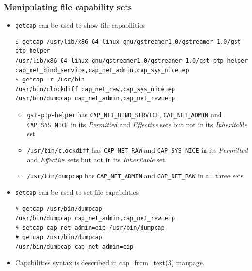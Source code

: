 \begin{frame}[fragile]
	\frametitle{Manipulating file capability sets}
	\begin{itemize}
		\item \texttt{getcap} can be used to show file capabilities
			\begin{block}{}
				{\tiny
				\begin{verbatim}
$ getcap /usr/lib/x86_64-linux-gnu/gstreamer1.0/gstreamer-1.0/gst-ptp-helper
/usr/lib/x86_64-linux-gnu/gstreamer1.0/gstreamer-1.0/gst-ptp-helper cap_net_bind_service,cap_net_admin,cap_sys_nice=ep
$ getcap -r /usr/bin
/usr/bin/clockdiff cap_net_raw,cap_sys_nice=ep
/usr/bin/dumpcap cap_net_admin,cap_net_raw=eip
\end{verbatim}
}
			\end{block}
			\begin{itemize}
				\item \texttt{gst-ptp-helper} has \texttt{CAP\_NET\_BIND\_SERVICE},
					\texttt{CAP\_NET\_ADMIN} and \texttt{CAP\_SYS\_NICE} in its
					\emph{Permitted} and \emph{Effective} sets
					but not in its \emph{Inheritable} set
				\item \texttt{/usr/bin/clockdiff} has \texttt{CAP\_NET\_RAW} and
					\texttt{CAP\_SYS\_NICE} in its \emph{Permitted} and \emph{Effective} sets
					but not in its \emph{Inheritable} set
				\item \texttt{/usr/bin/dumpcap} has \texttt{CAP\_NET\_ADMIN} and
					\texttt{CAP\_NET\_RAW} in all three sets
			\end{itemize}
		\item \texttt{setcap} can be used to set file capabilities
			\begin{block}{}
				{\tiny
				\begin{verbatim}
# getcap /usr/bin/dumpcap
/usr/bin/dumpcap cap_net_admin,cap_net_raw=eip
# setcap cap_net_admin=eip /usr/bin/dumpcap
# getcap /usr/bin/dumpcap
/usr/bin/dumpcap cap_net_admin=eip
\end{verbatim}
}
			\end{block}
		\item Capabilities syntax is described in
			\href{https://manned.org/cap_from_text.3}{cap\_from\_text(3)} manpage.
	\end{itemize}
\end{frame}

